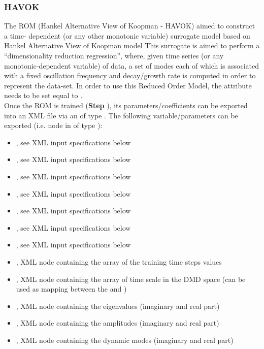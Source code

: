 \subsubsection{HAVOK}
  The  ROM (Hankel Alternative View of Koopman - HAVOK) aimed to construct a time-
  dependent (or any other monotonic     variable) surrogate model based on Hankel Alternative View
  of Koopman model     This surrogate is aimed to perform a ``dimensionality reduction regression'',
  where, given time     series (or any monotonic-dependent variable) of data, a set of modes each of
  which is associated     with a fixed oscillation frequency and decay/growth rate is computed
  in order to represent the data-set.     In order to use this Reduced Order Model, the
   attribute      needs to be set equal to .     \\
  Once the ROM  is trained (\textbf{Step} ), its parameters/coefficients can be
  exported into an XML file     via an  of type . The following
  variable/parameters  can be exported (i.e.  node     in  of type
  ):     \begin{itemize}       \item {}, see XML input
  specifications below       \item {}, see XML input specifications below       \item
  , see XML input specifications below       \item {}, see XML input
  specifications below       \item {}, see XML input specifications below
  \item {}, see XML input specifications below       \item {}, see XML
  input specifications below       \item {}, XML node containing the array of the
  training time steps values       \item {}, XML node containing the array of
  time scale in the DMD space (can be used as mapping       between the   and
  )       \item {}, XML node containing the eigenvalues (imaginary
  and real part)       \item {}, XML node containing the amplitudes (imaginary and
  real part)       \item {}, XML node containing the dynamic modes (imaginary and real
  part)     \end{itemize}


